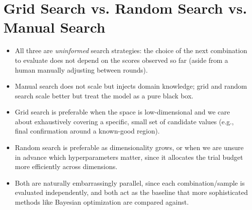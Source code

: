 \documentclass[conference]{IEEEtran}
\begin{document}
\section*{Grid Search vs. Random Search vs. Manual Search}
\begin{itemize}
    \item All three are \textit{uninformed} search strategies: the choice of the next combination to evaluate does not depend on the scores observed so far (aside from a human manually adjusting between rounds).
    \item Manual search does not scale but injects domain knowledge; grid and random search scale better but treat the model as a pure black box.
    \item Grid search is preferable when the space is low-dimensional and we care about exhaustively covering a specific, small set of candidate values (e.g., final confirmation around a known-good region).
    \item Random search is preferable as dimensionality grows, or when we are unsure in advance which hyperparameters matter, since it allocates the trial budget more efficiently across dimensions.
    \item Both are naturally embarrassingly parallel, since each combination/sample is evaluated independently, and both act as the baseline that more sophisticated methods like Bayesian optimization are compared against.
\end{itemize}
\end{document}
